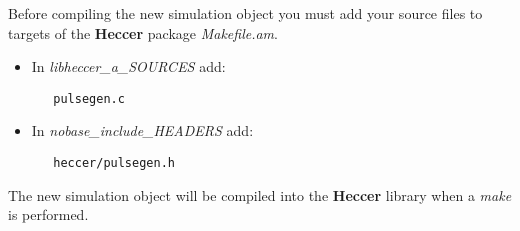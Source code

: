 \documentclass[12pt]{article}
\begin{document}
Before compiling the new simulation object you must add your source files to targets of the {\bf Heccer} package {\it Makefile.am}.

\begin{itemize}
   \item In {\it libheccer\_a\_SOURCES} add:
\begin{verbatim}
   pulsegen.c
\end{verbatim}
   \item In {\it nobase\_include\_HEADERS} add:
\begin{verbatim}
   heccer/pulsegen.h 
\end{verbatim}
\end{itemize}
The new simulation object will be compiled into the {\bf Heccer} library when a {\it make} is performed.
\end{document}
